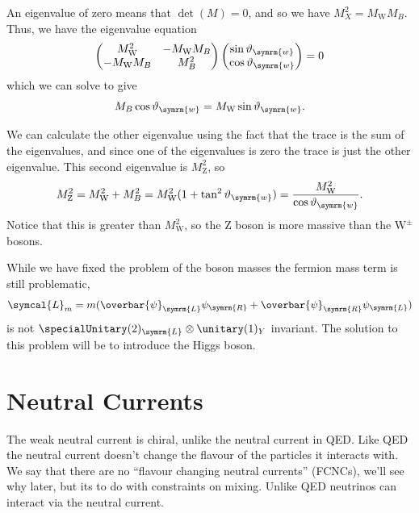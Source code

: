 \documentclass[fleqn]{NotesClass}
\newcommand{\Pparticle}[1]{\mathrm{#1}}
\newcommand{\PZ}{\ensuremath{\Pparticle{Z}}}
\newcommand{\PW}{\ensuremath{\Pparticle{W}}}
\newcommand{\PWpm}{\ensuremath{\Pparticle{W}^{\pm}}}
\newcommand{\diracadjoint}[1]{\overbar{#1}}
\newcommand{\lagrangianDensity}{\symcal{L}}
\newcommand{\Left}{\symrm{L}}
\newcommand{\Right}{\symrm{R}}
\newcommand{\weinbergangle}{\vartheta_{\symrm{w}}}
\begin{document}
    An eigenvalue of zero means that \(\det(M) = 0\), and so we have \(M_X^2 = M_{\PW}M_B\).
    Thus, we have the eigenvalue equation
    \begin{equation}
        \begin{pmatrix}
            M_{\PW}^2 & -M_{\PW}M_B\\
            -M_{\PW}M_B & M_B^2
        \end{pmatrix}
        \begin{pmatrix}
            \sin\weinbergangle\\
            \cos\weinbergangle
        \end{pmatrix}
        = 0
    \end{equation}
    which we can solve to give
    \begin{equation}
        M_B \cos\weinbergangle = M_{\PW}\sin\weinbergangle.
    \end{equation}
    
    We can calculate the other eigenvalue using the fact that the trace is the sum of the eigenvalues, and since one of the eigenvalues is zero the trace is just the other eigenvalue.
    This second eigenvalue is \(M_{\PZ}^2\), so
    \begin{equation}
        M_{\PZ}^2 = M_{\PW}^2 + M_B^2 = M_{\PW}^2(1 + \tan^2\weinbergangle) = \frac{M_{\PW}^2}{\cos\weinbergangle}.
    \end{equation}
    Notice that this is greater than \(M_{\PW}^2\), so the \PZ{} boson is more massive than the \PWpm{} bosons.
    
    While we have fixed the problem of the boson masses the fermion mass term is still problematic,
    \begin{equation}
        \lagrangianDensity_{m} = m(\diracadjoint{\psi}_{\Left}\psi_{\Right} + \diracadjoint{\psi}_{\Right}\psi_{\Left})
    \end{equation}
    is not \(\specialUnitary(2)_{\Left} \otimes \unitary(1)_Y\) invariant.
    The solution to this problem will be to introduce the Higgs boson.
    
    \section{Neutral Currents}
    The weak neutral current is chiral, unlike the neutral current in QED.
    Like QED the neutral current doesn't change the flavour of the particles it interacts with.
    We say that there are no \enquote{flavour changing neutral currents} (FCNCs), we'll see why later, but its to do with constraints on mixing.
    Unlike QED neutrinos can interact via the neutral current.
    
\end{document}
